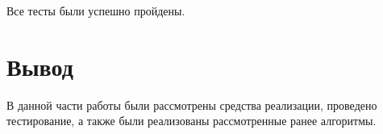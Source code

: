 Все тесты были успешно пройдены.



\section*{Вывод}

В данной части работы были рассмотрены средства реализации, проведено тестирование, а также были реализованы рассмотренные ранее алгоритмы.
